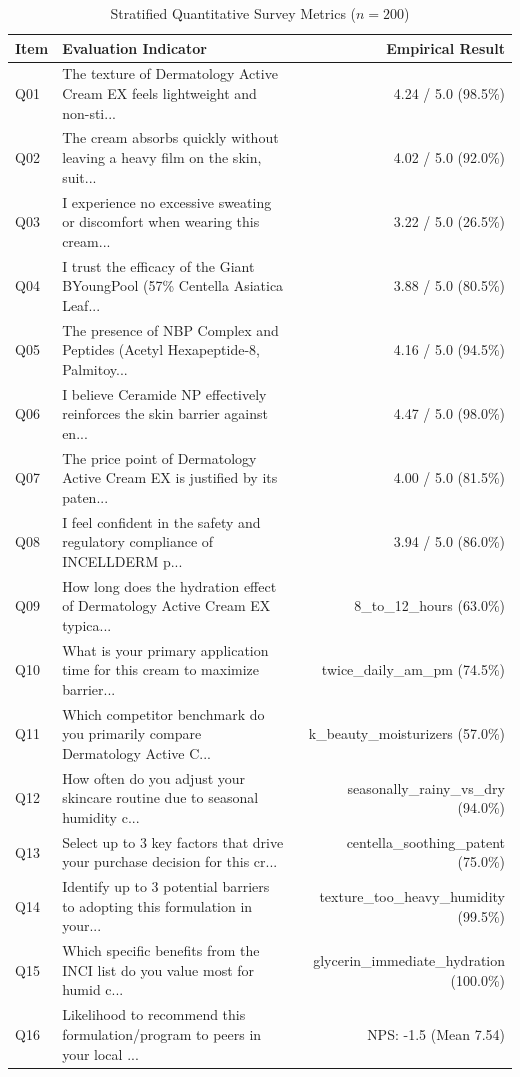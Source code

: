 \documentclass[10pt,twocolumn,a4paper]{article}
\begin{document}
\begin{table}[t]
\centering
\caption{Stratified Quantitative Survey Metrics ($n = 200$)}
\label{tab:metrics}
\small
\begin{tabularx}{\textwidth}{l X r}
\toprule
\textbf{Item} & \textbf{Evaluation Indicator} & \textbf{Empirical Result} \\
\midrule
Q01 & The texture of Dermatology Active Cream EX feels lightweight and non-sti... & 4.24 / 5.0 (98.5\%) \\
Q02 & The cream absorbs quickly without leaving a heavy film on the skin, suit... & 4.02 / 5.0 (92.0\%) \\
Q03 & I experience no excessive sweating or discomfort when wearing this cream... & 3.22 / 5.0 (26.5\%) \\
Q04 & I trust the efficacy of the Giant BYoungPool (57\% Centella Asiatica Leaf... & 3.88 / 5.0 (80.5\%) \\
Q05 & The presence of NBP Complex and Peptides (Acetyl Hexapeptide-8, Palmitoy... & 4.16 / 5.0 (94.5\%) \\
Q06 & I believe Ceramide NP effectively reinforces the skin barrier against en... & 4.47 / 5.0 (98.0\%) \\
Q07 & The price point of Dermatology Active Cream EX is justified by its paten... & 4.00 / 5.0 (81.5\%) \\
Q08 & I feel confident in the safety and regulatory compliance of INCELLDERM p... & 3.94 / 5.0 (86.0\%) \\
Q09 & How long does the hydration effect of Dermatology Active Cream EX typica... & 8\_to\_12\_hours (63.0\%) \\
Q10 & What is your primary application time for this cream to maximize barrier... & twice\_daily\_am\_pm (74.5\%) \\
Q11 & Which competitor benchmark do you primarily compare Dermatology Active C... & k\_beauty\_moisturizers (57.0\%) \\
Q12 & How often do you adjust your skincare routine due to seasonal humidity c... & seasonally\_rainy\_vs\_dry (94.0\%) \\
Q13 & Select up to 3 key factors that drive your purchase decision for this cr... & centella\_soothing\_patent (75.0\%) \\
Q14 & Identify up to 3 potential barriers to adopting this formulation in your... & texture\_too\_heavy\_humidity (99.5\%) \\
Q15 & Which specific benefits from the INCI list do you value most for humid c... & glycerin\_immediate\_hydration (100.0\%) \\
Q16 & Likelihood to recommend this formulation/program to peers in your local ... & NPS: -1.5 (Mean 7.54) \\
\bottomrule
\end{tabularx}
\end{table}
\end{document}
